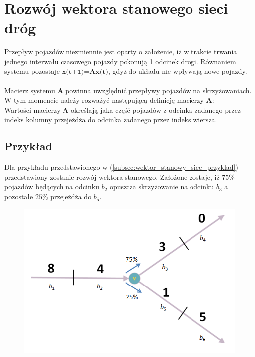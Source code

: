 \documentclass[12pt]{book}
\theoremstyle{plain}
\begin{document}
\section{Rozwój wektora stanowego sieci dróg}
Przepływ pojazdów niezmiennie jest oparty o założenie, iż w trakcie trwania jednego interwału czasowego pojazdy pokonują 1 odcinek drogi. Równaniem systemu pozostaje $\textbf{x(t+1)=Ax(t)}$, gdyż do układu nie wpływają nowe pojazdy.\\ \\
Macierz systemu $\textbf{A}$ powinna uwzględnić przepływy pojazdów na skrzyżowaniach. W tym momencie należy rozważyć następującą definicję macierzy $\textbf{A}$:\\
Wartości macierzy \textbf{A} określają jaka część pojazdów z odcinka zadanego przez indeks kolumny przejeżdża do odcinka zadanego przez indeks wiersza.


\subsection{Przykład}
Dla przykładu przedstawionego w (\ref{subsec:wektor_stanowy_siec_przyklad}) przedstawiony zostanie rozwój wektora stanowego. Założone zostaje, iż $75 \%$ pojazdów będących na odcinku $b_2$ opuszcza skrzyżowanie na odcinku $b_3$ a pozostałe $25 \%$ przejeżdża do $b_5$.

\begin{figure}[H]
	\centering
	\includegraphics[width=14cm]{3_single_road_lights}
	\caption{}
	\label{fig:3_single_road}
\end{figure}
\end{document}
